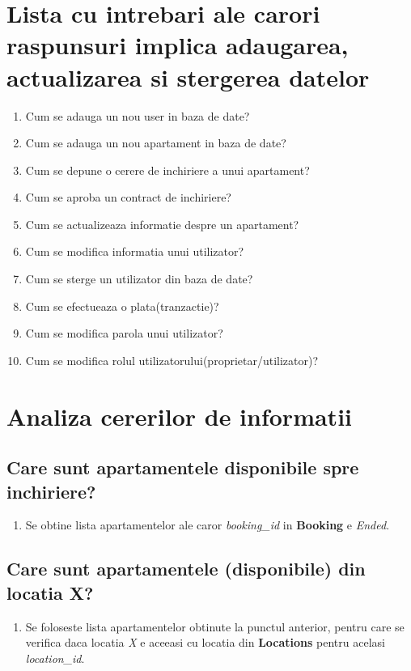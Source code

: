 \documentclass[12pt]{article} %
\begin{document}
\section{Lista cu intrebari ale carori raspunsuri implica adaugarea, actualizarea si stergerea datelor} %
\begin{enumerate}
\item Cum se adauga un nou user in baza de date?
\item Cum se adauga un nou apartament in baza de date?
\item Cum se depune o cerere de inchiriere a unui apartament?
\item Cum se aproba un contract de inchiriere?
\item Cum se actualizeaza informatie despre un apartament?
\item Cum se modifica informatia unui utilizator?
\item Cum se sterge un utilizator din baza de date?
\item Cum se efectueaza o plata(tranzactie)?
\item Cum se modifica parola unui utilizator?
\item Cum se modifica rolul utilizatorului(proprietar/utilizator)?
\end{enumerate}

\lstset{style=mystyle}

\section{Analiza cererilor de informatii}

\subsection {Care sunt apartamentele disponibile spre inchiriere?}
\begin{enumerate}
\item Se obtine lista apartamentelor ale caror \textit{booking\_id} in \textbf{Booking} e \textit{Ended}.
\end{enumerate}


\subsection {Care sunt apartamentele (disponibile) din locatia X?}
\begin{enumerate}
\item Se foloseste lista apartamentelor obtinute la punctul anterior, pentru care se verifica daca locatia \textit{X} e aceeasi cu locatia din \textbf{Locations} pentru acelasi \textit{location\_id}.
\end{enumerate}

\end{document}
